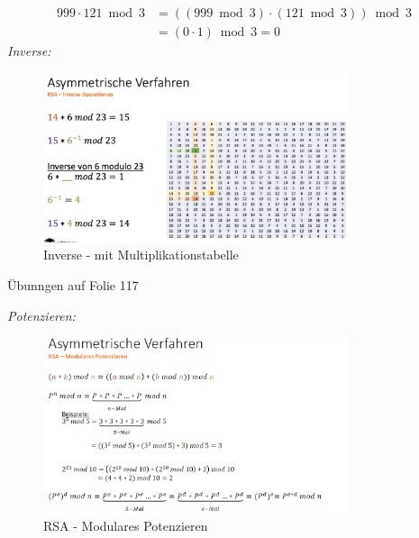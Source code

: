 \documentclass[a4paper,12pt]{article}
\begin{document}
    \begin{align*}
    999 \cdot 121 \bmod 3 &= ((999 \bmod 3) \cdot (121 \bmod 3)) \bmod 3 \\
    &= (0 \cdot 1) \bmod 3 = 0
    \end{align*}
\vspace*{1em}
\textit{Inverse:}
\begin{figure}[H]
    \centering
    \includegraphics[width=0.8\textwidth]{bilder/inverse.png}
    \caption{Inverse - mit Multiplikationstabelle}
    \label{fig:inverse}
\end{figure}
Übunngen auf Folie 117

\vspace*{1em}
\textit{Potenzieren:}
\begin{figure}[H]
    \centering
    \includegraphics[width=0.8\textwidth]{bilder/potenzieren.png}
    \caption{RSA - Modulares Potenzieren}
    \label{fig:inverse}
\end{figure}
\end{document}
